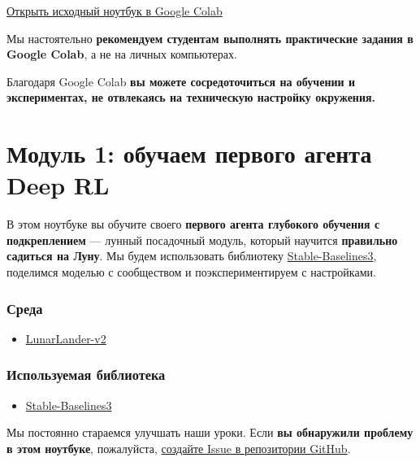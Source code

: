 \documentclass[11pt,a4paper]{article}
\begin{document}
\href{https://colab.research.google.com/github/huggingface/deep-rl-class/blob/master/notebooks/unit1/unit1.ipynb}{Открыть исходный ноутбук в Google Colab}

Мы настоятельно \textbf{рекомендуем студентам выполнять практические задания в Google Colab}, а не на личных компьютерах.

Благодаря Google Colab \textbf{вы можете сосредоточиться на обучении и экспериментах, не отвлекаясь на техническую настройку окружения.}

\section{Модуль 1: обучаем первого агента Deep RL}\label{unit-1-train-your-first-deep-reinforcement-learning-agent}


В этом ноутбуке вы обучите своего \textbf{первого агента глубокого обучения с подкреплением} --- лунный посадочный модуль, который научится \textbf{правильно садиться на Луну}. Мы будем использовать библиотеку \href{https://stable-baselines3.readthedocs.io/en/master/}{Stable-Baselines3}, поделимся моделью с сообществом и поэкспериментируем с настройками.

\subsubsection{Среда}\label{the-environment}

\begin{itemize}
\tightlist
\item
  \href{https://gymnasium.farama.org/environments/box2d/lunar_lander/}{LunarLander-v2}
\end{itemize}

\subsubsection{Используемая библиотека}\label{the-library-used}

\begin{itemize}
\tightlist
\item
  \href{https://stable-baselines3.readthedocs.io/en/master/}{Stable-Baselines3}
\end{itemize}

Мы постоянно стараемся улучшать наши уроки. Если \textbf{вы обнаружили проблему в этом ноутбуке}, пожалуйста, \href{https://github.com/huggingface/deep-rl-class/issues}{создайте Issue в репозитории GitHub}.
\end{document}
